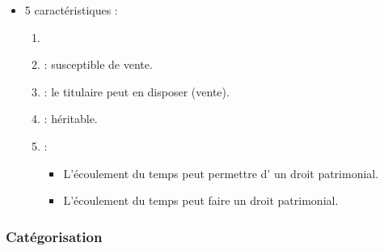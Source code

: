 \begin{itemize}
	\item 5 caractéristiques :
	\begin{enumerate}
		\item {}
		\item {} : susceptible de vente.
		\item {} : le titulaire peut en disposer (vente).
		\item {} : héritable.
		\item {} :
		\begin{itemize}
			\item L'écoulement du temps peut permettre d' un droit patrimonial.
			\item L'écoulement du temps peut faire  un droit patrimonial.
		\end{itemize}
	\end{enumerate}
\end{itemize}

\subsubsection{Catégorisation}

